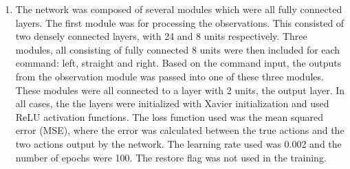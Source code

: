 \documentclass{article}
\begin{document}
\begin{enumerate}[label=(\roman*)]
\item The network was composed of several modules which were all fully connected layers. The first module was for processing the observations. This consisted of two densely connected layers, with 24 and 8 units respectively. Three modules, all consisting of fully connected 8 units were then included for each command: left, straight and right. Based on the command input, the outputs from the observation module was passed into one of these three modules. These modules were all connected to a layer with 2 units, the output layer. In all cases, the the layers were initialized with Xavier initialization and used ReLU activation functions. The loss function used was the mean squared error (MSE), where the error was calculated between the true actions and the two actions output by the network. The learning rate used was 0.002 and the number of epochs were 100. The restore flag was not used in the training.

\end{enumerate}
\end{document}
